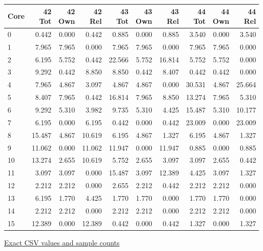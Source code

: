 \begin{center}{\scriptsize\setlength{\tabcolsep}{3pt}
\begin{tabular}{lrrrrrrrrr}
\toprule
Core & 42 Tot & 42 Own & 42 Rel & 43 Tot & 43 Own & 43 Rel & 44 Tot & 44 Own & 44 Rel \\
\midrule
0 & 0.442 & 0.000 & 0.442 & 0.885 & 0.000 & 0.885 & 3.540 & 0.000 & 3.540 \\
1 & 7.965 & 7.965 & 0.000 & 7.965 & 7.965 & 0.000 & 7.965 & 7.965 & 0.000 \\
2 & 6.195 & 5.752 & 0.442 & 22.566 & 5.752 & 16.814 & 5.752 & 5.752 & 0.000 \\
3 & 9.292 & 0.442 & 8.850 & 8.850 & 0.442 & 8.407 & 0.442 & 0.442 & 0.000 \\
4 & 7.965 & 4.867 & 3.097 & 4.867 & 4.867 & 0.000 & 30.531 & 4.867 & 25.664 \\
5 & 8.407 & 7.965 & 0.442 & 16.814 & 7.965 & 8.850 & 13.274 & 7.965 & 5.310 \\
6 & 9.292 & 5.310 & 3.982 & 9.735 & 5.310 & 4.425 & 15.487 & 5.310 & 10.177 \\
7 & 6.195 & 0.000 & 6.195 & 0.442 & 0.000 & 0.442 & 23.009 & 0.000 & 23.009 \\
8 & 15.487 & 4.867 & 10.619 & 6.195 & 4.867 & 1.327 & 6.195 & 4.867 & 1.327 \\
9 & 11.062 & 0.000 & 11.062 & 11.947 & 0.000 & 11.947 & 0.885 & 0.000 & 0.885 \\
10 & 13.274 & 2.655 & 10.619 & 5.752 & 2.655 & 3.097 & 3.097 & 2.655 & 0.442 \\
11 & 3.097 & 3.097 & 0.000 & 15.487 & 3.097 & 12.389 & 4.425 & 3.097 & 1.327 \\
12 & 2.212 & 2.212 & 0.000 & 2.655 & 2.212 & 0.442 & 2.212 & 2.212 & 0.000 \\
13 & 6.195 & 1.770 & 4.425 & 1.770 & 1.770 & 0.000 & 1.770 & 1.770 & 0.000 \\
14 & 2.212 & 2.212 & 0.000 & 2.212 & 2.212 & 0.000 & 2.212 & 2.212 & 0.000 \\
15 & 12.389 & 0.000 & 12.389 & 0.442 & 0.000 & 0.442 & 1.327 & 0.000 & 1.327 \\
\bottomrule\end{tabular}}
{\footnotesize\href{https://github.com/sanjeevkrishnaa/Compiler-Driven-ACE/blob/codex/ace-scheduler-correctness/docs/latex/qft96_final/data/heatmap_torus_dijkstra_route_m3.csv}{Exact CSV values and sample counts}}
\end{center}
